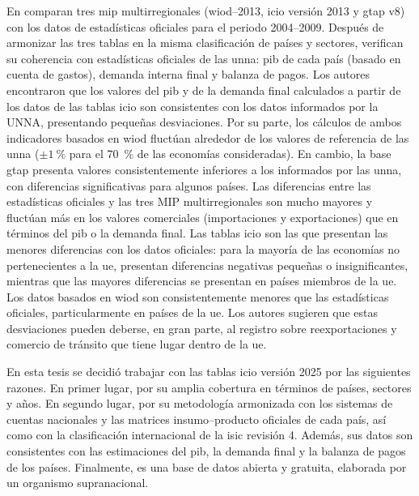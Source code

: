 En \textcite{Jones2014} comparan tres \gls{mip} multirregionales (\gls{wiod}--2013, \acrshort{icio} versión 2013 y \acrshort{gtap} v8) con los datos de estadísticas oficiales para el periodo 2004--2009. Después de armonizar las tres tablas en la misma clasificación de países y sectores, verifican su coherencia con estadísticas oficiales de las \gls{unna}: \gls{pib} de cada país (basado en cuenta de gastos), demanda interna final y balanza de pagos. Los autores encontraron que los valores del \gls{pib} y de la demanda final calculados a partir de los datos de las tablas \gls{icio} son consistentes con los datos informados por la UNNA, presentando pequeñas desviaciones. Por su parte, los cálculos de ambos indicadores basados en \gls{wiod} fluctúan alrededor de los valores de referencia de las \gls{unna} ($\pm 1~\%$ para el 70~\% de las economías consideradas). En cambio, la base \gls{gtap} presenta valores consistentemente inferiores a los informados por las \gls{unna}, con diferencias significativas para algunos países. Las diferencias entre las estadísticas oficiales y las tres MIP multirregionales son mucho mayores y fluctúan más en los valores comerciales (importaciones y exportaciones) que en términos del \gls{pib} o la demanda final. Las tablas \gls{icio} son las que presentan las menores diferencias con los datos oficiales: para la mayoría de las economías no pertenecientes a la \gls{ue}, presentan diferencias negativas pequeñas o insignificantes, mientras que las mayores diferencias se presentan en países miembros de la \gls{ue}. Los datos basados en \gls{wiod} son consistentemente menores que las estadísticas oficiales, particularmente en países de la \gls{ue}. Los autores sugieren que estas desviaciones pueden deberse, en gran parte, al registro sobre reexportaciones y comercio de tránsito que tiene lugar dentro de la \gls{ue}.

En esta tesis se decidió trabajar con las tablas \gls{icio} versión 2025 por las siguientes razones. En primer lugar, por su amplia cobertura en términos de países, sectores y años. En segundo lugar, por su metodología armonizada con los sistemas de cuentas nacionales y las matrices insumo--producto oficiales de cada país, así como con la clasificación internacional de la \gls{isic} revisión 4. Además, sus datos son consistentes con las estimaciones del \gls{pib}, la demanda final y la balanza de pagos de los países. %
Finalmente, es una base de datos abierta y gratuita, elaborada por un organismo supranacional.

